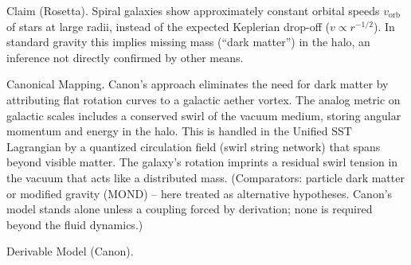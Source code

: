 \documentclass[11pt]{article}
\begin{document}
Claim (Rosetta). Spiral galaxies show approximately constant orbital speeds $v_{\text{orb}}$ of stars at large radii, instead of the expected Keplerian drop-off ($v \propto r^{-1/2}$). In standard gravity this implies missing mass (“dark matter”) in the halo, an inference not directly confirmed by other means.


Canonical Mapping. Canon’s approach eliminates the need for dark matter by attributing flat rotation curves to a galactic aether vortex. The analog metric on galactic scales includes a conserved swirl of the vacuum medium, storing angular momentum and energy in the halo. This is handled in the Unified SST Lagrangian by a quantized circulation field (swirl string network) that spans beyond visible matter. The galaxy’s rotation imprints a residual swirl tension in the vacuum that acts like a distributed mass. (Comparators: particle dark matter or modified gravity (MOND) – here treated as alternative hypotheses. Canon’s model stands alone unless a coupling forced by derivation; none is required beyond the fluid dynamics.)


Derivable Model (Canon).
\end{document}
